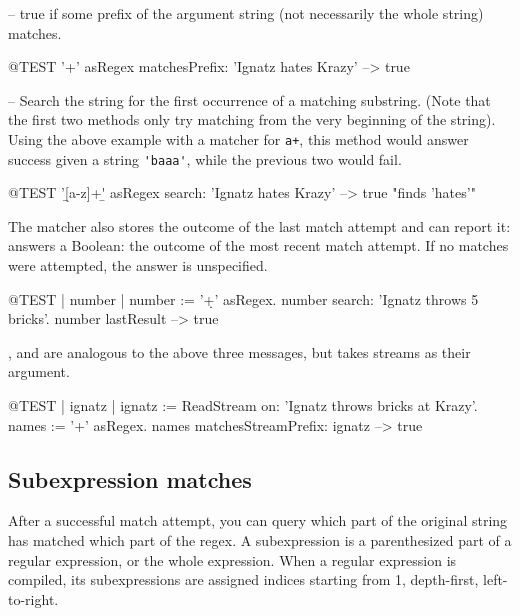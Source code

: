\documentclass[10pt,twoside,chapterprefix=false]{scrbook}
\renewcommand{\ct}{\lstinline[mathescape=false,basicstyle={\sffamily\upshape}]}
\begin{document}
{ -- true if some prefix of the argument string (not necessarily the whole string) matches.

\begin{ToSh-code}{@TEST}
'\w+' asRegex matchesPrefix: 'Ignatz hates Krazy' --> true
\end{ToSh-code}

 -- Search the string for the first occurrence of a matching substring. (Note that the first two methods only try matching from  the very beginning of the string). Using the above example with a  matcher for \ct{a+}, this method would answer success given a string \ct{'baaa'}, while the previous two would fail.

\begin{ToSh-code}{@TEST}
'\b[a-z]+\b' asRegex search: 'Ignatz hates Krazy' --> true    "finds 'hates'"
\end{ToSh-code}


The matcher also stores the outcome of the last match attempt and can report it:  answers a Boolean: the outcome of the most recent match attempt. If no matches were attempted, the answer is unspecified.

\begin{ToSh-code}{@TEST | number |}
number := '\d+' asRegex.
number search: 'Ignatz throws 5 bricks'.
number lastResult --> true
\end{ToSh-code}

,  and  are analogous to the above three messages, but takes streams as their argument.

\begin{ToSh-code}{@TEST | ignatz |}
ignatz := ReadStream on: 'Ignatz throws bricks at Krazy'.
names := '\<[A-Z][a-z]+\>' asRegex.
names matchesStreamPrefix: ignatz --> true
\end{ToSh-code}

\subsection{Subexpression matches}

After a successful match attempt, you can query which part of the original string has matched which part of the regex. A subexpression is a parenthesized part of a regular expression, or the whole expression. When a regular expression is compiled, its subexpressions are assigned indices starting from 1, depth-first, left-to-right.

}
\end{document}
